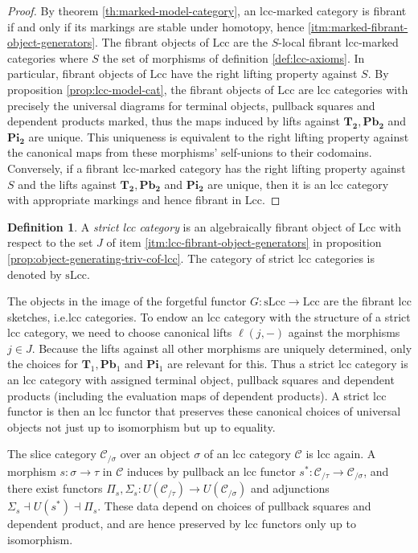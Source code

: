 \documentclass[a4paper]{article}
\theoremstyle{remark}
\theoremstyle{definition}
\newtheorem{definition}[theorem]{Definition}
\begin{document}
\begin{proof}
  By theorem \ref{th:marked-model-category}, an lcc-marked category is fibrant if and only if its markings are stable under homotopy, hence \ref{itm:marked-fibrant-object-generators}.
  The fibrant objects of $\mathrm{Lcc}$ are the $S$-local fibrant lcc-marked categories where $S$ the set of morphisms of definition \ref{def:lcc-axioms}.
  In particular, fibrant objects of $\mathrm{Lcc}$ have the right lifting property against $S$.
  By proposition \ref{prop:lcc-model-cat}, the fibrant objects of $\mathrm{Lcc}$ are lcc categories with precisely the universal diagrams for terminal objects, pullback squares and dependent products marked, thus the maps induced by lifts against $\mathbf{T_2}, \mathbf{Pb_2}$ and $\mathbf{Pi_2}$ are unique.
  This uniqueness is equivalent to the right lifting property against the canonical maps from these morphisms' self-unions to their codomains.
  Conversely, if a fibrant lcc-marked category has the right lifting property against $S$ and the lifts against $\mathbf{T_2}, \mathbf{Pb_2}$ and $\mathbf{Pi_2}$ are unique, then it is an lcc category with appropriate markings and hence fibrant in $\mathrm{Lcc}$.
\end{proof}

\begin{definition}
  A \emph{strict lcc category} is an algebraically fibrant object of $\mathrm{Lcc}$ with respect to the set $J$ of item \ref{itm:lcc-fibrant-object-generators} in proposition \ref{prop:object-generating-triv-cof-lcc}.
  The category of strict lcc categories is denoted by $\mathrm{sLcc}$.
\end{definition}
The objects in the image of the forgetful functor $G : \mathrm{sLcc} \rightarrow \mathrm{Lcc}$ are the fibrant lcc sketches, i.e.\@ lcc categories.
To endow an lcc category with the structure of a strict lcc category, we need to choose canonical lifts $\ell(j, -)$ against the morphisms $j \in J$.
Because the lifts against all other morphisms are uniquely determined, only the choices for $\mathbf{T}_1, \mathbf{Pb}_1$ and $\mathbf{Pi}_1$ are relevant for this.
Thus a strict lcc category is an lcc category with assigned terminal object, pullback squares and dependent products (including the evaluation maps of dependent products).
A strict lcc functor is then an lcc functor that preserves these canonical choices of universal objects not just up to isomorphism but up to equality.

The slice category $\mathcal{C}_{/ \sigma}$ over an object $\sigma$ of an lcc category $\mathcal{C}$ is lcc again.
A morphism $s : \sigma \rightarrow \tau$ in $\mathcal{C}$ induces by pullback an lcc functor $s^* : \mathcal{C}_{/ \tau} \rightarrow \mathcal{C}_{/ \sigma}$, and there exist functors $\Pi_s, \Sigma_s : U(\mathcal{C}_{/ \tau}) \rightarrow U(\mathcal{C}_{/ \sigma})$ and adjunctions $\Sigma_s \dashv U(s^*) \dashv \Pi_s$.
These data depend on choices of pullback squares and dependent product, and are hence preserved by lcc functors only up to isomorphism.
\end{document}
